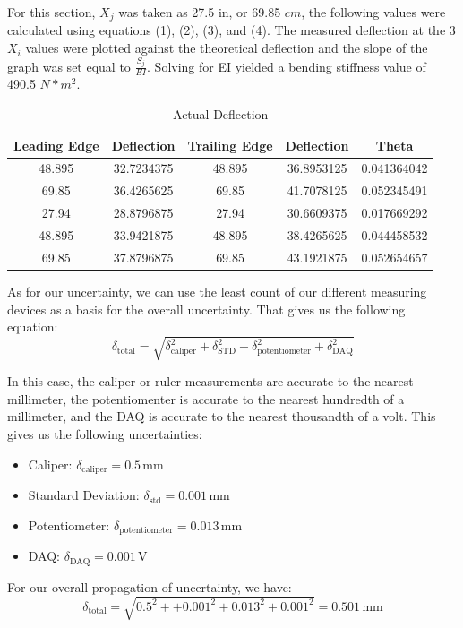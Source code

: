 \documentclass{article}
\begin{document}
For this section, \(X_j\) was taken as 27.5 in, or 69.85 \(cm\), the following values were calculated using equations (1), (2), (3), and (4).  
The measured deflection at the 3 \(X_i\) values were plotted against the theoretical deflection and the slope of the graph was set equal to \(\frac{S_j}{EI}\).  Solving for EI yielded a bending stiffness value of 490.5 \(N*m^2\).

\begin{table}[hbtp]
  \centering
  \begin{tabular}{ccccc}
  \hline
  Leading Edge & Deflection & Trailing Edge & Deflection & Theta \\
  \hline
  48.895 & 32.7234375 & 48.895 & 36.8953125 & 0.041364042 \\
  69.85 & 36.4265625 & 69.85 & 41.7078125 & 0.052345491 \\
  27.94 & 28.8796875 & 27.94 & 30.6609375 & 0.017669292 \\
  48.895 & 33.9421875 & 48.895 & 38.4265625 & 0.044458532 \\
  69.85 & 37.8796875 & 69.85 & 43.1921875 & 0.052654657 \\
  \hline
  \end{tabular}
  \caption{Actual Deflection}
  \label{table:actual_deflection}
  \end{table}
  
As for our uncertainty, we can use the least count of our different measuring devices as a basis for the overall uncertainty. That gives us the following equation:
\[
\delta_{\text{total}} = \sqrt{\delta_{\text{caliper}}^2 + \delta_{\text{STD}}^2 + \delta_{\text{potentiometer}}^2 + \delta_{\text{DAQ}}^2}
\]

In this case, the caliper or ruler measurements are accurate to the nearest millimeter, the potentiomenter is accurate to the nearest hundredth of a millimeter, and the DAQ is accurate to the nearest thousandth of a volt. This gives us the following uncertainties: 
\begin{itemize}
  \item Caliper: \(\delta_{\text{caliper}} = 0.5\, \text{mm}\)
  \item Standard Deviation: \(\delta_{\text{std}} = 0.001\, \text{mm}\)
  \item Potentiometer: \(\delta_{\text{potentiometer}} = 0.013\, \text{mm}\)
  \item DAQ: \(\delta_{\text{DAQ}} = 0.001\, \text{V}\)
\end{itemize}

For our overall propagation of uncertainty, we have:
\[
\delta_{\text{total}} = \sqrt{0.5^2 + + 0.001^2 + 0.013^2 + 0.001^2} = 0.501\, \text{mm}
\]
\end{document}
